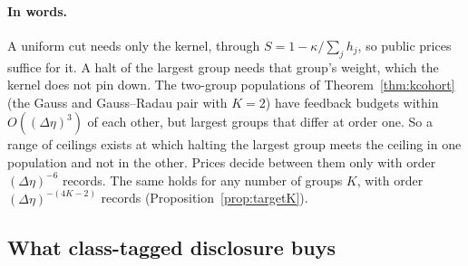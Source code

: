 
\paragraph{In words.} A uniform cut needs only the kernel, through $S=1-\kappa/\sum_jh_j$, so public prices suffice for it. A halt of the largest group needs that group's weight, which the kernel does not pin down. The two-group populations of Theorem~\ref{thm:kcohort} (the Gauss and Gauss--Radau pair with $K=2$) have feedback budgets within $O((\Delta\eta)^3)$ of each other, but largest groups that differ at order one. So a range of ceilings exists at which halting the largest group meets the ceiling in one population and not in the other. Prices decide between them only with order $(\Delta\eta)^{-6}$ records. The same holds for any number of groups $K$, with order $(\Delta\eta)^{-(4K-2)}$ records (Proposition~\ref{prop:targetK}).

\subsection{What class-tagged disclosure buys}


